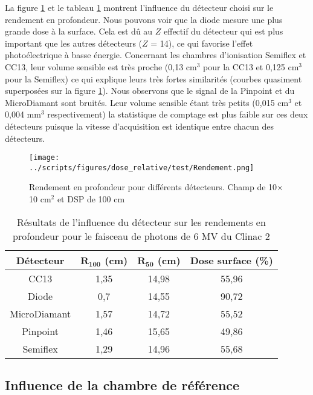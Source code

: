 \documentclass{book}
\begin{document}
La figure \ref*{fig_rdt_detecteurs} et le tableau \ref*{table_rdt_detecteurs} montrent l'influence du détecteur choisi sur le rendement en profondeur. Nous pouvons voir que la diode mesure une plus grande dose à la surface. Cela est dû au $Z$ effectif du détecteur qui est plus important que les autres détecteurs ($Z$ = 14), ce qui favorise l'effet photoélectrique à basse énergie. Concernant les chambres d'ionisation Semiflex et CC13, leur volume sensible est très proche (0,13 cm$^3$ pour la CC13 et 0,125 cm$^3$ pour la Semiflex) ce qui explique leurs très fortes similarités (courbes quasiment superposées sur la figure \ref*{fig_rdt_detecteurs}). Nous observons que le signal de la Pinpoint et du MicroDiamant sont bruités. Leur volume sensible étant très petits (0,015 cm$^3$ et 0,004 mm$^3$ respectivement) la statistique de comptage est plus faible sur ces deux détecteurs puisque la vitesse d'acquisition est identique entre chacun des détecteurs.

\begin{figure}[h]
  \centering
  \texttt{[image: ../scripts/figures/dose\_relative/test/Rendement.png]}
  \caption{Rendement en profondeur pour différents détecteurs. Champ de 10$\times$10 cm$^2$ et DSP de 100 cm}
  \label{fig_rdt_detecteurs}
\end{figure}

\begin{table}[h]
  \centering
  \begin{tabular}{cccc}
    \toprule
    \textbf{Détecteur} & $\mathbf{R_{100}}$ \textbf{(cm)} & $\mathbf{R_{50}}$ \textbf{(cm)} & \textbf{Dose surface (\%)} \\
    \toprule
    CC13 & 1,35 & 14,98 & 55,96 \\
    Diode & 0,7 & 14,55 & 90,72 \\
    MicroDiamant & 1,57 & 14,72 & 55,52 \\
    Pinpoint & 1,46 & 15,65 & 49,86 \\
    Semiflex & 1,29 & 14,96 & 55,68 \\
    \bottomrule
  \end{tabular}
  \caption{Résultats de l'influence du détecteur sur les rendements en profondeur pour le faisceau de photons de 6 MV du Clinac 2}
  \label{table_rdt_detecteurs}
\end{table}

\newpage
\subsection{Influence de la chambre de référence}
\end{document}
